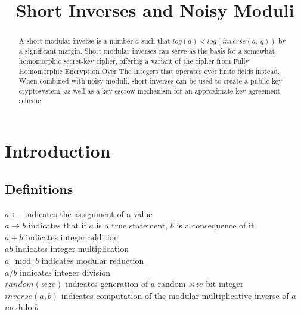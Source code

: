\documentclass[preprint]{iacrtrans}
\author{}
\institute{}
\title[Short Inverses and Noisy Moduli]{Short Inverses and Noisy Moduli}
\begin{document}
\maketitle


\begin{abstract}
 A short modular inverse is a number $a$ such that $log(a) < log(inverse(a,\ q))$ by a significant margin. Short modular inverses can serve as the basis for a somewhat homomorphic secret-key cipher, offering a variant of the cipher from Fully Homomorphic Encryption Over The Integers  that operates over finite fields instead. When combined with noisy moduli, short inverses can be used to create a public-key cryptosystem, as well as a key escrow mechanism for an approximate key agreement scheme. 
 \end{abstract}

\section{Introduction}
\todo{}

\subsection{Definitions}
$a \leftarrow$ indicates the assignment of a value\\
$a \rightarrow b$ indicates that if $a$ is a true statement, $b$ is a consequence of it\\
$a + b$ indicates integer addition\\
$a b$ indicates integer multiplication\\
$a \mod b$ indicates modular reduction\\
$a / b$ indicates integer division\\
$random(size)$ indicates generation of a random $size$-bit integer\\
$inverse(a, b)$ indicates computation of the modular multiplicative inverse of $a$ modulo $b$\\
\end{document}
